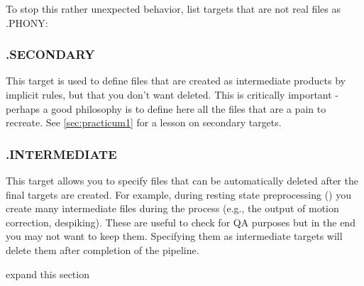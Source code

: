 To stop this rather unexpected behavior, list targets that are not real files as .PHONY:


\subsubsection{.SECONDARY}
This target is used to define files that are created as intermediate products by implicit rules, but that you don't want deleted. This is critically important - perhaps a good philosophy is to define here all the files that are a pain to recreate. See \autoref{sec:practicum1} for a lesson on secondary targets. 

\subsubsection{.INTERMEDIATE}
This target allows you to specify files that can be automatically deleted after the final targets are created. For example, during resting state preprocessing () you create many intermediate files during the process (e.g., the output of motion correction, despiking). These are useful to check for QA purposes but in the end you may not want to keep them. Specifying them as intermediate targets will delete them after completion of the pipeline.

{\color{red} expand this section}



